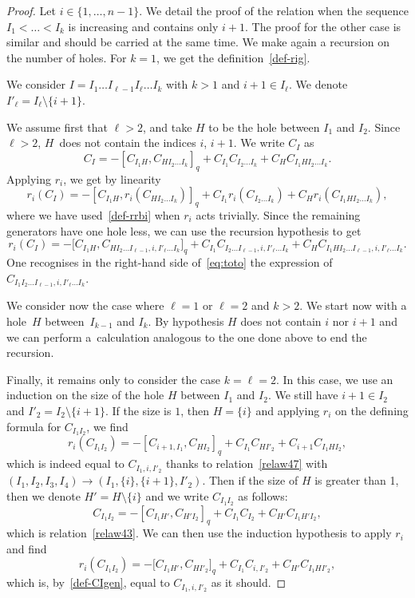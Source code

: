 \documentclass[10pt,a4paper]{amsart}
\numberwithin{equation}{section}
\theoremstyle{definition}
\begin{document}
\begin{proof}
Let $i\in\{1,\dots,n-1\}$. We detail the proof of the relation when the sequence ${I_1\!<\dots<I_{k}}$ is increasing and contains only $i+1$. The proof for the other case is similar and should be carried at the same time.
We make again a recursion on the number of holes. For $k=1$, we get the definition~\eqref{def-rig}.

We consider $I=I_1\dots I_{\ell-1} I_{\ell}\dots I_{k}$ with $k>1$ and $i+1\in I_{\ell}$. We denote $I'_{\ell}=I_{\ell}\setminus\{i+1\}$.

We assume first that $\ell>2$, and take $H$ to be the hole between $I_1$ and $I_2$. Since $\ell>2$, $H$~does not contain the indices $i$, $i+1$. We write $C_I$ as
\begin{equation*}
C_I = -[C_{I_1H} , C_{HI_{2}\dots I_{k}}]_q+
C_{I_1} C_{I_{2}\dots I_{k}}+C_{H} C_{I_1 HI_{2}\dots I_{k}}.
\end{equation*}
Applying $r_i$, we get by linearity
\begin{equation*}
r_i(C_I) = -[C_{I_1 H} , r_i(C_{HI_{2}\dots I_{k}})]_q+
C_{I_1} r_i(C_{I_{2}\dots I_{k}})+C_{H} r_i(C_{I_1 HI_{2}\dots I_{k}}),
\end{equation*}
where we have used~\eqref{def-rrbi} when $r_i$ acts trivially.
Since the remaining generators have one hole less, we can use the recursion hypothesis to get
\begin{equation}\label{eq:toto}
r_i(C_I) = -\big[C_{I_1 H} , C_{HI_{2}\dots I_{\ell-1},i,I'_{\ell}\dots I_{k}}\big]_q+
C_{I_1} C_{I_{2}\dots I_{\ell-1},i,I'_{\ell}\dots I_{k}}+C_{H} C_{I_1 HI_{2}\dots I_{\ell-1},i,I'_{\ell}\dots I_{k}}.
\end{equation}
One recognises in the right-hand side of~\eqref{eq:toto} the expression of $C_{I_1I_{2}\dots I_{\ell-1},i,I'_{\ell}\dots I_{k}}$.

We consider now the case where $\ell=1$ or $\ell=2$ and $k>2$. We start now with a hole~$H$ between~$I_{k-1}$ and $I_{k}$. By hypothesis $H$ does not contain $i$ nor $i+1$ and we can perform a~calculation analogous to the one done above to end the recursion.

Finally, it remains only to consider the case $k=\ell=2$. In this case, we use an induction on the size of the hole $H$ between $I_1$ and $I_2$. We still have $i+1\in I_2$ and $I'_2=I_2\setminus\{i+1\}$. If the size is $1$, then $H=\{i\}$ and applying $r_i$ on the defining formula for $C_{I_1I_2}$, we find
\[r_i(C_{I_1I_2}) = -[C_{i+1,I_1} , C_{HI_2}]_q+
C_{I_1} C_{HI'_2}+C_{i+1} C_{I_1 HI_{2}},\]
which is indeed equal to $C_{I_1,i,I'_2}$ thanks to relation~\eqref{relaw47} with $(I_1,I_2,I_3,I_4)\to (I_1,\{i\},{\{i+1\}},\allowbreak I'_2)$. Then if the size of $H$ is greater than 1, then we denote $H'=H\setminus\{i\}$ and we write $C_{I_1I_2}$ as follows:
\[C_{I_1I_2} = -[C_{I_1H'} , C_{H'I_2}]_q+
C_{I_1} C_{I_2}+C_{H'} C_{I_1 H'I_{2}},\]
which is relation~\eqref{relaw43}. We can then use the induction hypothesis to apply $r_i$ and find
\[r_i(C_{I_1I_2}) = -\big[C_{I_1H'} , C_{HI'_2}\big]_q+
C_{I_1} C_{i,I'_2}+C_{H'} C_{I_1 HI'_{2}},\]
which is, by~\eqref{def-CIgen}, equal to $C_{I_1,i,I'_2}$ as it should.


\end{proof}
\end{document}
